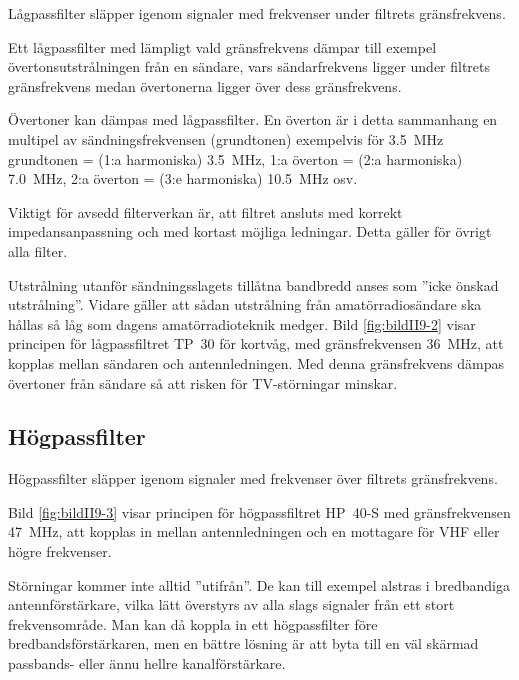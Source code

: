
Lågpassfilter släpper igenom signaler med frekvenser under filtrets
gränsfrekvens.

Ett lågpassfilter med lämpligt vald gränsfrekvens dämpar till exempel
övertonsutstrålningen från en sändare, vars sändarfrekvens ligger under filtrets
gränsfrekvens medan övertonerna ligger över dess gränsfrekvens.

Övertoner kan dämpas med lågpassfilter.
En överton är i detta sammanhang en multipel av sändningsfrekvensen
(grundtonen) exempelvis för
\SI{3,5}{\mega\hertz} grundtonen = (1:a harmoniska) \SI{3,5}{\mega\hertz},
1:a överton = (2:a harmoniska) \SI{7,0}{\mega\hertz},
2:a överton = (3:e harmoniska) \SI{10,5}{\mega\hertz} osv.

Viktigt för avsedd filterverkan är, att filtret ansluts med korrekt
impedansanpassning och med kortast möjliga ledningar.
Detta gäller för övrigt alla filter.

Utstrålning utanför sändningsslagets tillåtna bandbredd anses som
''icke önskad utstrålning''.
Vidare gäller att sådan utstrålning från amatörradiosändare ska hållas så låg
som dagens amatörradioteknik medger.
Bild \ref{fig:bildII9-2} visar principen för lågpassfiltret TP~30 för kortvåg,
med gränsfrekvensen \SI{36}{\mega\hertz}, att kopplas mellan sändaren och
antennledningen.
Med denna gränsfrekvens dämpas övertoner från sändare så att risken för
TV-störningar minskar.

\subsection{Högpassfilter}
\label{Högpassfilter}

Högpassfilter släpper igenom signaler med frekvenser över filtrets
gränsfrekvens.


Bild \ref{fig:bildII9-3} visar principen för högpassfiltret HP~40-S med
gränsfrekvensen \SI{47}{\mega\hertz}, att kopplas in mellan antennledningen och
en mottagare för VHF eller högre frekvenser.

Störningar kommer inte alltid ''utifrån''.
De kan till exempel alstras i bredbandiga antennförstärkare, vilka lätt
överstyrs av alla slags signaler från ett stort frekvensområde.
Man kan då koppla in ett högpassfilter före bredbandsförstärkaren, men en
bättre lösning är att byta till en väl skärmad passbands- eller ännu hellre
kanalförstärkare.

